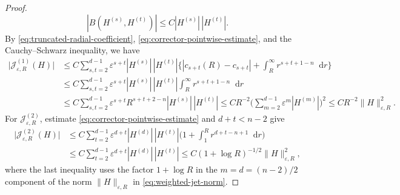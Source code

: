 \documentclass[11pt]{article}
\numberwithin{equation}{section}
\theoremstyle{remark}
\newcommand{\dd}{\mathop{}\!\mathrm{d}}
\begin{document}
\begin{proof}
{
\[
 |B(H^{(s)},H^{(t)})|\le C|H^{(s)}|\,|H^{(t)}|.
\]
}
 By \eqref{eq:truncated-radial-coefficient},
\eqref{eq:corrector-pointwise-estimate}, and the  Cauchy--Schwarz
inequality, we have
{
\begin{equation*}
\begin{aligned}
 \bigl|\mathcal J_{\varepsilon,R}^{(1)}(H)\bigr|
 &\le C\sum_{s,t=2}^{d-1}\varepsilon^{s+t}|H^{(s)}|\,|H^{(t)}|
 \bigg\{|c_{s+t}(R)-c_{s+t}|
 +\int_R^\infty r^{s+t+1-n}\dd r\bigg\}\\
 &\le C\sum_{s,t=2}^{d-1}\varepsilon^{s+t}|H^{(s)}|\,|H^{(t)}|
 \int_R^\infty r^{s+t+1-n}\dd r\\
 &\le C\sum_{s,t=2}^{d-1}
 \varepsilon^{s+t}R^{s+t+2-n}|H^{(s)}|\,|H^{(t)}|
 \le CR^{-2}\bigg(\sum_{m=2}^{d-1}
 \varepsilon^m|H^{(m)}|\bigg)^2
 \le CR^{-2}\|H\|_{\varepsilon,R}^2.
\end{aligned}
\end{equation*}
}
 For
$\mathcal J_{\varepsilon,R}^{(2)}$, estimate
\eqref{eq:corrector-pointwise-estimate} and $d+t<n-2$ give
{
\begin{equation*}\begin{aligned}
 \bigl|\mathcal J_{\varepsilon,R}^{(2)}(H)\bigr|
 &\le C\sum_{t=2}^{d-1}\varepsilon^{d+t}|H^{(d)}|\,|H^{(t)}|
 \bigg(1+\int_1^R r^{d+t-n+1}\dd r\bigg)\\
 &\le C\sum_{t=2}^{d-1}\varepsilon^{d+t}|H^{(d)}|\,|H^{(t)}|
 \le C(1+\log R)^{-1/2}\|H\|_{\varepsilon,R}^2,
\end{aligned}\end{equation*}
}
where the last inequality uses the factor \(1+\log R\) in the \(m=d=(n-2)/2\) component of the norm  $\|H\|_{\varepsilon,R}$
 in \eqref{eq:weighted-jet-norm}.


\end{proof}
\end{document}
